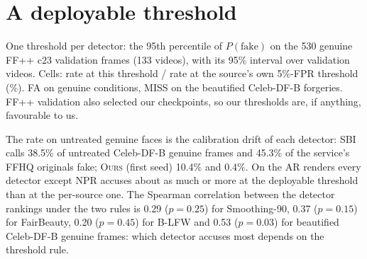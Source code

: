 \documentclass[10pt]{article}
\newcommand{\ours}{\textsc{Ours}}
\begin{document}
\section{A deployable threshold}
\label{sec:deploy}
\begin{table}[H]
\centering
\caption{One threshold per detector: the 95th percentile of $P(\text{fake})$ on the 530 genuine FF++ c23 validation frames (133
videos), with its 95\% interval over validation videos. Cells: rate at this threshold / rate at the source's own 5\%-FPR
threshold (\%). FA on genuine conditions, MISS on the beautified Celeb-DF-B forgeries. FF++ validation also selected our
checkpoints, so our thresholds are, if anything, favourable to us.}
\label{tab:deploy}
\scriptsize
\begin{adjustbox}{max width=\linewidth}\end{adjustbox}
\end{table}
The rate on untreated genuine faces is the calibration drift of each detector: SBI calls 38.5\% of untreated Celeb-DF-B genuine
frames and 45.3\% of the service's FFHQ originals fake; \ours{} (first seed) 10.4\% and 0.4\%. On the AR renders every detector
except NPR accuses about as much or more at the deployable threshold than at the per-source one. The Spearman correlation between
the detector rankings under the two rules is 0.29 ($p=0.25$) for Smoothing-90, 0.37 ($p=0.15$) for FairBeauty, 0.20 ($p=0.45$)
for B-LFW and 0.53 ($p=0.03$) for beautified Celeb-DF-B genuine frames: which detector accuses most depends on the threshold rule.
\end{document}
